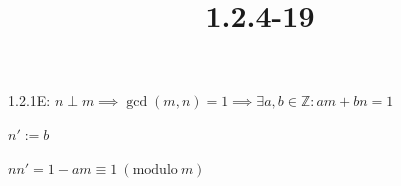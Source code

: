 \documentclass{article}
\title{1.2.4-19}
\begin{document}
\maketitle

1.2.1E: $n \perp m \implies \gcd(m,n) = 1 \implies \exists a, b \in \mathbb{Z}: am + bn = 1$

$n' := b$

$nn' = 1 - am \equiv 1\ (\mathrm{modulo}\ m)$
\end{document}
